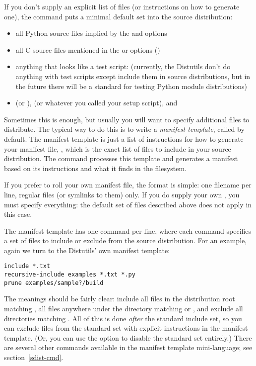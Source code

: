 \documentclass{howto}
\begin{document}
If you don't supply an explicit list of files (or instructions on how to
generate one), the  command puts a minimal default set
into the source distribution:
\begin{itemize}
\item all Python source files implied by the  and
   options
\item all C source files mentioned in the  or
   options ()
\item anything that looks like a test script: 
  (currently, the Distutils don't do anything with test scripts except
  include them in source distributions, but in the future there will be
  a standard for testing Python module distributions)
\item {} (or ),  (or whatever 
  you called your setup script), and 
\end{itemize}

Sometimes this is enough, but usually you will want to specify
additional files to distribute.  The typical way to do this is to write
a \emph{manifest template}, called  by default.  The
manifest template is just a list of instructions for how to generate
your manifest file, , which is the exact list of files to
include in your source distribution.  The  command
processes this template and generates a manifest based on its
instructions and what it finds in the filesystem.

If you prefer to roll your own manifest file, the format is simple: one
filename per line, regular files (or symlinks to them) only.  If you do
supply your own , you must specify everything: the
default set of files described above does not apply in this case.

The manifest template has one command per line, where each command
specifies a set of files to include or exclude from the source
distribution.  For an example, again we turn to the Distutils' own
manifest template:

\begin{verbatim}
include *.txt
recursive-include examples *.txt *.py
prune examples/sample?/build
\end{verbatim}

The meanings should be fairly clear: include all files in the
distribution root matching , all files anywhere under the
 directory matching  or , and
exclude all directories matching .  All of
this is done \emph{after} the standard include set, so you can exclude
files from the standard set with explicit instructions in the manifest
template.  (Or, you can use the  option to
disable the standard set entirely.)  There are several other commands
available in the manifest template mini-language; see
section~\ref{sdist-cmd}.
\end{document}
